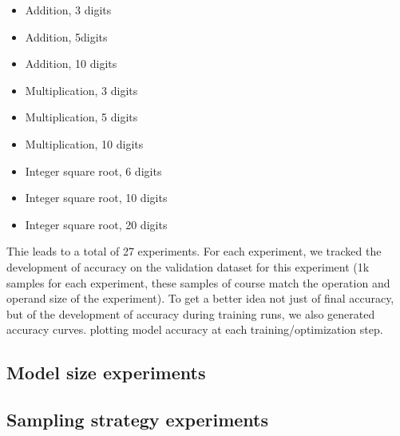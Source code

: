 \begin{itemize}
	\item Addition, 3 digits
	\item Addition, 5digits
	\item Addition, 10 digits
	\item Multiplication, 3 digits
	\item Multiplication, 5 digits
	\item Multiplication, 10 digits
	\item Integer square root, 6 digits
	\item Integer square root, 10 digits
	\item Integer square root, 20 digits
\end{itemize}

Thie leads to a total of 27 experiments.
For each experiment, we tracked the development of accuracy on the validation dataset for this experiment (1k samples for each experiment, these samples of course match the operation and operand size of the experiment).
To get a better idea not just of final accuracy, but of the development of accuracy during training runs, we also generated accuracy curves. plotting model accuracy at each training/optimization step.

\subsection{Model size experiments}

\subsection{Sampling strategy experiments}

